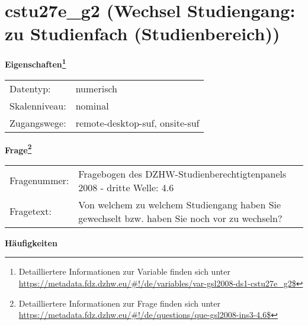 
    \setcounter{footnote}{0}

    \vspace*{-1.8cm}
	\section{cstu27e\_g2 (Wechsel Studiengang: zu Studienfach (Studienbereich))}
	\label{section:cstu27e_g2}



    \vspace*{0.5cm}
    \noindent\textbf{Eigenschaften\footnote{Detailliertere Informationen zur Variable finden sich unter
		\url{https://metadata.fdz.dzhw.eu/\#!/de/variables/var-gsl2008-ds1-cstu27e_g2$}}}\\
	\begin{tabularx}{\hsize}{@{}lX}
	Datentyp: & numerisch \\
	Skalenniveau: & nominal \\
	Zugangswege: &
	  remote-desktop-suf, 
	  onsite-suf
 \\
    \end{tabularx}



				\vspace*{0.5cm}
                \noindent\textbf{Frage\footnote{Detailliertere Informationen zur Frage finden sich unter
		              \url{https://metadata.fdz.dzhw.eu/\#!/de/questions/que-gsl2008-ins3-4.6$}}}\\
				\begin{tabularx}{\hsize}{@{}lX}
					Fragenummer: &
					  Fragebogen des DZHW-Studienberechtigtenpanels 2008 - dritte Welle:
					  4.6
 \\
					Fragetext: & Von welchem zu welchem Studiengang haben Sie gewechselt bzw. haben Sie noch vor zu wechseln? \\
				\end{tabularx}





        		\vspace*{0.5cm}
                \noindent\textbf{Häufigkeiten}


